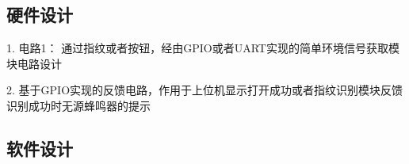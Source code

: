 \documentclass[UTF8,AutoFakeBold=1,AutoFakeSlant,zihao=-4]{cucugthesis}
\begin{document}
\subsection{硬件设计}

1. 电路1： 
通过指纹或者按钮，经由GPIO或者UART实现的简单环境信号获取模块电路设计

2. 基于GPIO实现的反馈电路，作用于上位机显示打开成功或者指纹识别模块反馈识别成功时无源蜂鸣器的提示

\subsection{软件设计}

% 
% 

%     

% 
\end{document}
